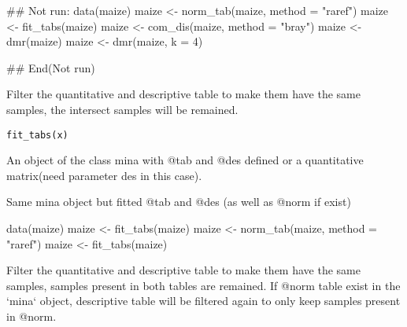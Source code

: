 \documentclass[a4paper]{book}
\begin{document}
%
\begin{Examples}
\begin{ExampleCode}
## Not run: 
data(maize)
maize <- norm_tab(maize, method = "raref")
maize <- fit_tabs(maize)
maize <- com_dis(maize, method = "bray")
maize <- dmr(maize)
maize <- dmr(maize, k = 4)

## End(Not run)
\end{ExampleCode}
\end{Examples}
%
\begin{Description}\relax
Filter the quantitative and descriptive table to make them have the same
samples, the intersect samples will be remained.
\end{Description}
%
\begin{Usage}
\begin{verbatim}
fit_tabs(x)
\end{verbatim}
\end{Usage}
%
\begin{Arguments}
\begin{ldescription}
\item[\code{x}] An object of the class mina with @tab and @des defined or a
quantitative matrix(need parameter des in this case).
\end{ldescription}
\end{Arguments}
%
\begin{Value}
Same mina object but fitted @tab and @des (as well as @norm if exist)
\end{Value}
%
\begin{Examples}
\begin{ExampleCode}
data(maize)
maize <- fit_tabs(maize)
maize <- norm_tab(maize, method = "raref")
maize <- fit_tabs(maize)
\end{ExampleCode}
\end{Examples}
%
\begin{Description}\relax
Filter the quantitative and descriptive table to make them have the same
samples, samples present in both tables are remained. If @norm table exist in
the `mina` object, descriptive table will be filtered again to only keep
samples present in @norm.
\end{Description}
\end{document}

